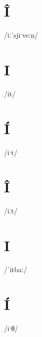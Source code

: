 \documentclass[10pt,a4paper,twoside]{book}
\begin{document}
\section*{Î}

\begin{multicols}{3}
 {/iːˈsjiˑveːn/} {}
\end{multicols}

\section*{I}

\begin{multicols}{3}
 {/it/} {}
\end{multicols}

\section*{Í}

\begin{multicols}{3}
 {/iˑt/} {}
\end{multicols}

\section*{Î}

\begin{multicols}{3}
 {/iːt/} {}
\end{multicols}

\section*{I}

\begin{multicols}{3}
 {/ˈitbaː/} {}
\end{multicols}

\section*{Í}

\begin{multicols}{3}
 {/iˑθ/} {}
\end{multicols}
\end{document}
